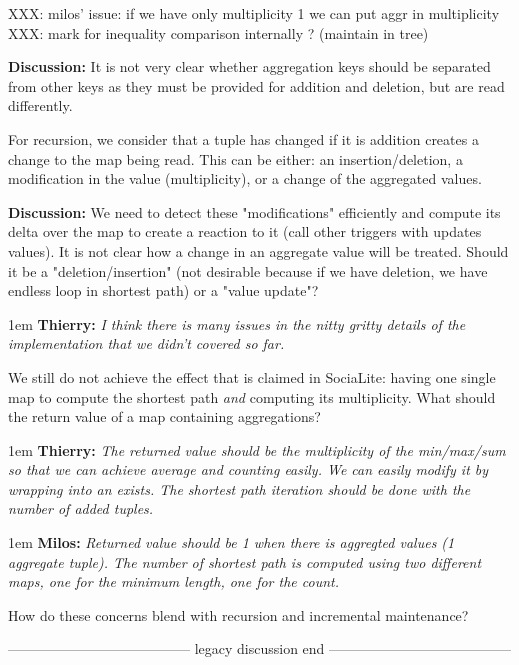 \documentclass[11pt]{article}
\newlength{\dlen}
\def\discuss#1{\par\hspace{2em}
\setlength{\dlen}{\textwidth}
\addtolength{\dlen}{-2em}
\begin{minipage}{\dlen}\footnotesize {\bf\color{red} Discussion:} #1\end{minipage}\par}
\def\say#1#2{\begingroup\par\leftskip1em {\bf #1:} \it #2\par\endgroup}
\begin{document}
{\color{red}
XXX: milos' issue: if we have only multiplicity 1 we can put aggr in multiplicity\\
XXX: mark for inequality comparison internally ? (maintain in tree)
}

\discuss{It is not very clear whether aggregation keys should be separated from other keys as they must be provided for addition and deletion, but are read differently.}
For recursion, we consider that a tuple has changed if it is addition creates a change to the map being read. This can be either: an insertion/deletion, a modification in the value (multiplicity), or a change of the aggregated values.
\discuss{We need to detect these "modifications" efficiently and compute its delta over the map to create a reaction to it (call other triggers with updates values). It is not clear how a change in an aggregate value will be treated. Should it be a "deletion/insertion" (not desirable because if we have deletion, we have endless loop in shortest path) or a "value update"?
	\say{Thierry}{I think there is many issues in the nitty gritty details of the implementation that we didn't covered so far.}
We still do not achieve the effect that is claimed in SociaLite: having one single map to compute the shortest path \textit{and} computing its multiplicity. What should the return value of a map containing aggregations?
	\say{Thierry}{The returned value should be the multiplicity of the min/max/sum so that we can achieve average and counting easily. We can easily modify it by wrapping into an exists. The shortest path iteration should be done with the number of added tuples.}
	\say{Milos}{Returned value should be 1 when there is aggregted values (1 aggregate tuple). The number of shortest path is computed using two different maps, one for the minimum length, one for the count.}
}
How do these concerns blend with recursion and incremental maintenance?

{\center --------------------------------------- legacy discussion end ---------------------------------------}
\end{document}
